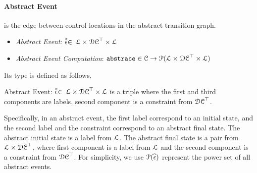  \paragraph{Abstract Event} is the edge between control locations in the abstract transition graph.
 
 \begin{itemize}
  \item \emph{Abstract Event}: 
  $\stackrel{\scriptscriptstyle{\alpha}}{\mathtt{\epsilon}{}} \in $
  $\mathcal{L} \times \mathcal{DC}^{\top} \times \mathcal{L}$
  \item \emph{Abstract Event Computation}: $\mathtt{abs}{\mathtt{trace}} \in \mathcal{C} \to \mathcal{P}( \mathcal{L} \times \mathcal{DC}^{\top} \times \mathcal{L} )$
 \end{itemize}
 Its type is defined as follows,
 \begin{defn}
   \label{def:abs_event}
   Abstract Event: 
   $\stackrel{\scriptscriptstyle{\alpha}}{\mathtt{\epsilon}{}} \in $
   $\mathcal{L} \times \mathcal{DC}^{\top} \times \mathcal{L}$
   is a 
   triple where the first and third components are labels,
   second component is a constraint from $\mathcal{DC}^{\top}$.
   \end{defn}
   Specifically, in an abstract event, 
   the first label correspond to an initial state, and 
   the second label and the constraint correspond to an abstract final state.
  The abstract initial state is a label from $\mathcal{L}$.
 The abstract final state is a pair from $\mathcal{L} \times \mathcal{DC}^{\top}$,  
 where first component is a label from $\mathcal{L}$ and the second component is a constraint from $\mathcal{DC}^{\top}$.
 For simplicity, we use $\mathcal{P}(\stackrel{\scriptscriptstyle{\alpha}}{\mathtt{\epsilon}{}})$ represent the power set of all abstract events.

